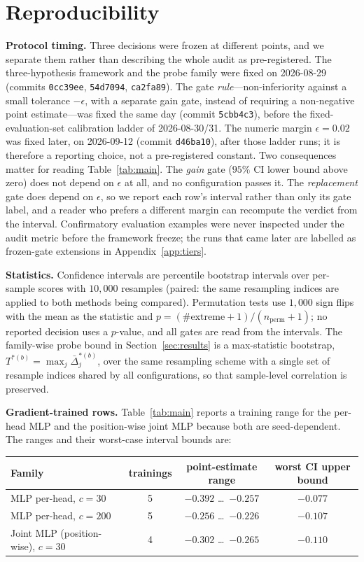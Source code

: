 \documentclass{article} %
\begin{document}
\section{Reproducibility}
\label{app:repro}
\textbf{Protocol timing.} Three decisions were frozen at different points, and
we separate them rather than describing the whole audit as pre-registered. The
three-hypothesis framework and the probe family were fixed on 2026-08-29
(commits \texttt{0cc39ee}, \texttt{54d7094}, \texttt{ca2fa89}). The gate
\emph{rule}---non-inferiority against a small tolerance $-\epsilon$, with a
separate gain gate, instead of requiring a non-negative point estimate---was
fixed the same day (commit \texttt{5cbb4c3}), before the fixed-evaluation-set
calibration ladder of 2026-08-30/31. The numeric margin $\epsilon{=}0.02$ was
fixed later, on 2026-09-12 (commit \texttt{d46ba10}), after those ladder runs;
it is therefore a reporting choice, not a pre-registered constant. Two
consequences matter for reading Table~\ref{tab:main}. The \emph{gain} gate
($95\%$ CI lower bound above zero) does not depend on $\epsilon$ at all, and no
configuration passes it. The \emph{replacement} gate does depend on $\epsilon$,
so we report each row's interval rather than only its gate label, and a reader
who prefers a different margin can recompute the verdict from the interval.
Confirmatory evaluation examples were never inspected under the audit metric
before the framework freeze; the runs that came later are labelled as
frozen-gate extensions in Appendix~\ref{app:tiers}.

\textbf{Statistics.} Confidence intervals are percentile bootstrap intervals
over per-sample scores with $10{,}000$ resamples (paired: the same resampling
indices are applied to both methods being compared). Permutation tests use
$1{,}000$ sign flips with the mean as the statistic and
$p=(\#\text{extreme}+1)/(n_{\text{perm}}+1)$; no reported decision uses a
$p$-value, and all gates are read from the intervals. The family-wise probe
bound in Section~\ref{sec:results} is a max-statistic bootstrap, $T^{*(b)}=\max_j \bar\Delta_j^{*(b)}$, over the same resampling scheme with a
single set of resample indices shared by all configurations, so that sample-level correlation is preserved.

\textbf{Gradient-trained rows.} Table~\ref{tab:main} reports a training range
for the per-head MLP and the position-wise joint MLP because both are
seed-dependent. The ranges and their worst-case interval bounds are:

\begin{center}
\footnotesize
\begin{tabular}{lccc}
\toprule
Family & trainings & point-estimate range & worst CI upper bound \\
\midrule
MLP per-head, $c{=}30$ & 5 & $-0.392$ \dots\ $-0.257$ & $-0.077$ \\
MLP per-head, $c{=}200$ & 5 & $-0.256$ \dots\ $-0.226$ & $-0.107$ \\
Joint MLP (position-wise), $c{=}30$ & 4 & $-0.302$ \dots\ $-0.265$ & $-0.110$ \\
\bottomrule
\end{tabular}
\end{center}
\end{document}
